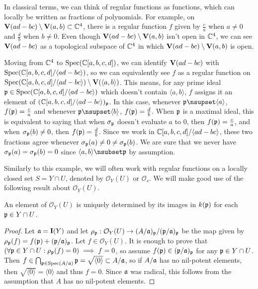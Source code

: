 \begin{example}\label{ex:reg_fun}\upshape
  In classical terms, we can think of regular functions as functions, which can locally be written as fractions of polynomials. For example, on $\operatorname{\mathbf V}(ad - bc) \setminus \operatorname{\mathbf V}(a, b) \subset \mathbb{C}^{4}$, there is a regular function $f$ given by $\frac c a$ when $a \neq 0$ and $\frac d b$ when $b \neq 0$. Even though $\operatorname{\mathbf V}(ad - bc) \setminus \operatorname{\mathbf V}(a, b)$ isn't open in $\mathbb{C}^{4}$, we can see $\operatorname{\mathbf V}(ad - bc)$ as a topological subspace of $\mathbb{C}^{4}$ in which $\operatorname{\mathbf V}(ad - bc) \setminus \operatorname{\mathbf V}(a, b)$ is open.

  Moving from $\mathbb{C}^{4}$ to $\operatorname{Spec}(\mathbb{C}[a, b, c, d])$, we can identify $\operatorname{\mathbf V}(ad - bc)$ with $\operatorname{Spec}(\mathbb{C}[a, b, c, d]/\langle ad - bc \rangle)$, so we can equivalently see $f$ as a regular function on $\operatorname{Spec}(\mathbb{C}[a, b, c, d]/\langle ad - bc \rangle) \setminus \operatorname{\mathbf V}(\langle a, b \rangle)$. This means, for any prime ideal $\mathfrak p \in \operatorname{Spec}(\mathbb{C}[a, b, c, d]/\langle ad - bc \rangle)$ which doesn't contain $\langle a, b \rangle$, $f$ assigns it an element of $(\mathbb{C}[a, b, c, d]/\langle ad - bc \rangle)_{\mathfrak p}$. In this case, whenever $\p \nsupset \langle a \rangle$, $f(\mathfrak p) = \frac c a$ and whenever $\p \nsupset \langle b \rangle$, $f(\mathfrak p) = \frac d b$. When $\mathfrak p$ is a maximal ideal, this is equivalent to saying that when $\sigma_{\mathfrak p}$ doesn't evaluate $a$ to 0, then $f(\mathfrak p) = \frac c a$, and when $\sigma_{\mathfrak p}(b) \neq 0$, then $f(\mathfrak p) = \frac d b$. Since we work in $\mathbb{C}[a, b, c, d]/\langle ad - bc \rangle$, these two fractions agree whenever $\sigma_{\mathfrak p}(a) \neq 0 \neq \sigma_{\mathfrak p}(b)$. We are sure that we never have $\sigma_{\mathfrak p}(a) = \sigma_{\mathfrak p}(b) = 0$ since $\langle a, b \rangle \nsubset \p$ by assumption.
\end{example}

Similarly to this example, we will often work with regular functions on a locally closed set $S = Y \cap U$, denoted by $\mathcal O_{Y}(U)$ or $\mathcal O_{s}$. We will make good use of the following result about $\mathcal O_{Y}(U)$.

\begin{lemma}\label{lem:O_Y_unique}
  An element of $\mathcal O_{Y}(U)$ is uniquely determined by its images in $k(\mathfrak p)$ for each $\mathfrak p \in Y \cap U$.
\end{lemma}
\begin{proof}
  Let $\mathfrak{a} = \operatorname{\mathbf I}(Y)$ and let $\rho_{\mathfrak p} : \mathcal O_{Y}(U) \to (A/\mathfrak{a})_{\mathfrak p}/(\mathfrak p/\mathfrak{a})_{\mathfrak p}$ be the map given by $\rho_{\mathfrak p}(f) = f(\mathfrak p) + (\mathfrak p/\mathfrak{a})_{\mathfrak p}$. Let $f \in \mathcal O_{Y}(U)$. It is enough to prove that $(\forall \mathfrak p \in Y \cap U: \rho_{\mathfrak p}(f) = 0) \implies f = 0$, so assume $f(\mathfrak p) \in (\mathfrak p/\mathfrak{a})_{\mathfrak p}$ for any $\mathfrak p \in Y \cap U$. Then $f \in \bigcap_{\mathfrak p \in \operatorname{Spec}(A/\mathfrak{a})} \mathfrak p = \sqrt{\langle 0 \rangle} \subset A/\mathfrak{a}$, so if $A/\mathfrak{a}$ has no nil-potent elements, then $\sqrt{\langle 0 \rangle} = \langle 0 \rangle$ and thus $f = 0$. Since $\mathfrak{a}$ was radical, this follows from the assumption that $A$ has no nil-potent elements.
\end{proof}


